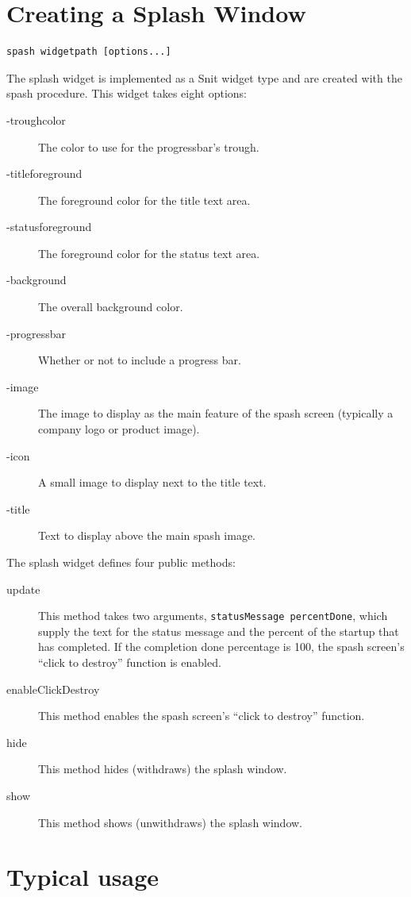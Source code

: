 \section{Creating a Splash Window}
\begin{lstlisting}[caption={Snit spash widget creation},
		   label={lst:SPL:spashWidget}]
spash widgetpath [options...]
\end{lstlisting}
The splash widget is implemented as a Snit widget type and are created
with the spash procedure.  This widget takes eight options:
\begin{description}
\item[-troughcolor] The color to use for the progressbar's trough.
\item[-titleforeground] The foreground color for the title text area.
\item[-statusforeground] The foreground color for the status text area.
\item[-background] The overall background color.
\item[-progressbar] Whether or not to include a progress bar.
\item[-image] The image to display as the main feature of the spash
screen (typically a company logo or product image).
\item[-icon] A small image to display next to the title text.
\item[-title] Text to display above the main spash image.
\end{description}
The splash widget defines four public methods:
\begin{description}
\item[update] This method takes two arguments, 
\lstinline=statusMessage percentDone=, which supply the text for the
status message and the percent of the startup that has completed.  If
the completion done percentage is 100, the spash screen's ``click to
destroy'' function is enabled.
\item[enableClickDestroy] This method enables the spash screen's ``click
to destroy'' function.
\item[hide] This method hides (withdraws) the splash window.
\item[show] This method shows (unwithdraws) the splash window.
\end{description}

\section{Typical usage}

